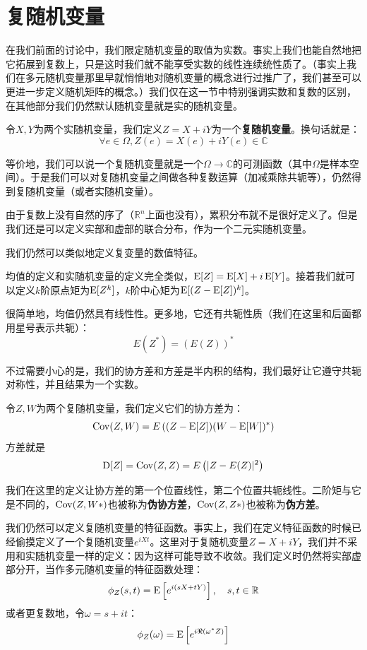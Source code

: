 \section{复随机变量}

在我们前面的讨论中，我们限定随机变量的取值为实数。事实上我们也能自然地把它拓展到复数上，只是这时我们就不能享受实数的线性连续统性质了。（事实上我们在多元随机变量那里早就悄悄地对随机变量的概念进行过推广了，我们甚至可以更进一步定义随机矩阵的概念。）我们仅在这一节中特别强调实数和复数的区别，在其他部分我们仍然默认随机变量就是实的随机变量。

令\(X, Y\)为两个实随机变量，我们定义\(Z=X+iY\)为一个\textbf{复随机变量}。换句话就是：
\[
\forall e \in \Omega, Z(e) = X(e) + iY(e) \in \mathbb{C}
\]

等价地，我们可以说一个复随机变量就是一个\(\Omega\to \mathbb{C}\)的可测函数（其中\(\Omega\)是样本空间）。于是我们可以对复随机变量之间做各种复数运算（加减乘除共轭等），仍然得到复随机变量（或者实随机变量）。

由于复数上没有自然的序了（\(\mathbb{R}^n\)上面也没有），累积分布就不是很好定义了。但是我们还是可以定义实部和虚部的联合分布，作为一个二元实随机变量。

我们仍然可以类似地定义复变量的数值特征。

均值的定义和实随机变量的定义完全类似，\(\operatorname{E}[Z]=\operatorname{E}[X]+i\operatorname{E}[Y]\)。接着我们就可以定义\(k\)阶原点矩为\(\operatorname{E}[Z^k]\)，\(k\)阶中心矩为\(\operatorname{E}[(Z-\operatorname{E}[Z])^k]\)。

很简单地，均值仍然具有线性性。更多地，它还有共轭性质（我们在这里和后面都用星号表示共轭）：
\[
E(Z^*) = \left(E(Z)\right)^*
\]

不过需要小心的是，我们的协方差和方差是半内积的结构，我们最好让它遵守共轭对称性，并且结果为一个实数。

令\(Z,W\)为两个复随机变量，我们定义它们的协方差为：
\[
\operatorname{Cov} (Z,W) = E\left((Z-\operatorname{E}[Z])(W-\operatorname{E}[W])^*\right)
\]
方差就是
\[
\operatorname{D}[Z] = \operatorname{Cov}(Z,Z)= E\left(|Z-E(Z)|^2\right)
\]

\begin{attention}
我们在这里的定义让协方差的第一个位置线性，第二个位置共轭线性。二阶矩与它是不同的，\(\operatorname{Cov}(Z,W*)\)也被称为\textbf{伪协方差}，\(\operatorname{Cov}(Z,Z*)\)也被称为\textbf{伪方差}。
\end{attention}

我们仍然可以定义复随机变量的特征函数。事实上，我们在定义特征函数的时候已经偷摸定义了一个复随机变量\(e^{iXt}\)。这里对于复随机变量\(Z=X+iY\)，我们并不采用和实随机变量一样的定义：因为这样可能导致不收敛。我们定义时仍然将实部虚部分开，当作多元随机变量的特征函数处理：
\[
\phi_Z(s, t) = \operatorname{E}\left[e^{i(sX+tY)}\right],\quad s,t\in \mathbb{R}
\]
或者更复数地，令\(\omega =s+it\)：
\[
\phi_Z(\omega) = \operatorname{E}\left[e^{i\Re(\omega^* Z)}\right]
\]

